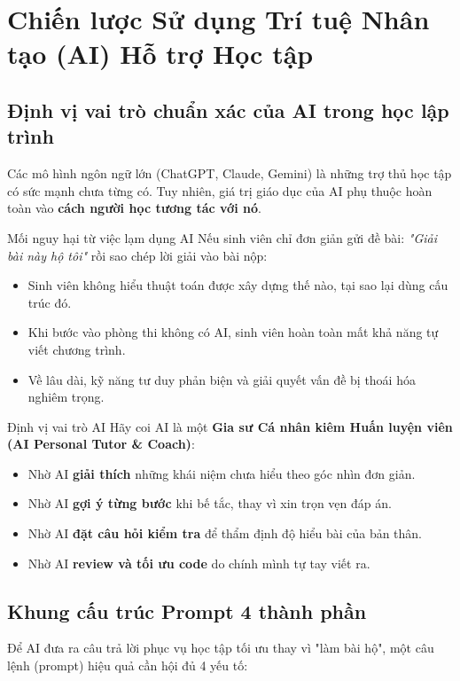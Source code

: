 \documentclass[11pt,a4paper]{article}
\begin{document}
\newpage
\section{Chiến lược Sử dụng Trí tuệ Nhân tạo (AI) Hỗ trợ Học tập}

\subsection{Định vị vai trò chuẩn xác của AI trong học lập trình}
Các mô hình ngôn ngữ lớn (ChatGPT, Claude, Gemini) là những trợ thủ học tập có sức mạnh chưa từng có. Tuy nhiên, giá trị giáo dục của AI phụ thuộc hoàn toàn vào \textbf{cách người học tương tác với nó}.

\begin{warningbox}{Mối nguy hại từ việc lạm dụng AI}
Nếu sinh viên chỉ đơn giản gửi đề bài: \textit{"Giải bài này hộ tôi"} rồi sao chép lời giải vào bài nộp:
\begin{itemize}[leftmargin=1.5em, itemsep=2pt]
    \item Sinh viên không hiểu thuật toán được xây dựng thế nào, tại sao lại dùng cấu trúc đó.
    \item Khi bước vào phòng thi không có AI, sinh viên hoàn toàn mất khả năng tự viết chương trình.
    \item Về lâu dài, kỹ năng tư duy phản biện và giải quyết vấn đề bị thoái hóa nghiêm trọng.
\end{itemize}
\end{warningbox}

\begin{tipbox}{Định vị vai trò AI}
Hãy coi AI là một \textbf{Gia sư Cá nhân kiêm Huấn luyện viên (AI Personal Tutor \& Coach)}:
\begin{itemize}[leftmargin=1.5em, itemsep=2pt]
    \item Nhờ AI \textbf{giải thích} những khái niệm chưa hiểu theo góc nhìn đơn giản.
    \item Nhờ AI \textbf{gợi ý từng bước} khi bế tắc, thay vì xin trọn vẹn đáp án.
    \item Nhờ AI \textbf{đặt câu hỏi kiểm tra} để thẩm định độ hiểu bài của bản thân.
    \item Nhờ AI \textbf{review và tối ưu code} do chính mình tự tay viết ra.
\end{itemize}
\end{tipbox}

\subsection{Khung cấu trúc Prompt 4 thành phần}
Để AI đưa ra câu trả lời phục vụ học tập tối ưu thay vì "làm bài hộ", một câu lệnh (prompt) hiệu quả cần hội đủ 4 yếu tố:
\end{document}
